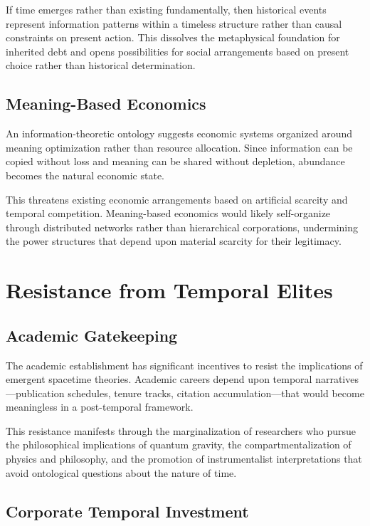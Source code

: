 \documentclass[12pt]{article}
\begin{document}
If time emerges rather than existing fundamentally, then historical events represent information patterns within a timeless structure rather than causal constraints on present action. This dissolves the metaphysical foundation for inherited debt and opens possibilities for social arrangements based on present choice rather than historical determination.

\subsection{Meaning-Based Economics}

An information-theoretic ontology suggests economic systems organized around meaning optimization rather than resource allocation. Since information can be copied without loss and meaning can be shared without depletion, abundance becomes the natural economic state.

This threatens existing economic arrangements based on artificial scarcity and temporal competition. Meaning-based economics would likely self-organize through distributed networks rather than hierarchical corporations, undermining the power structures that depend upon material scarcity for their legitimacy.

\section{Resistance from Temporal Elites}

\subsection{Academic Gatekeeping}

The academic establishment has significant incentives to resist the implications of emergent spacetime theories. Academic careers depend upon temporal narratives—publication schedules, tenure tracks, citation accumulation—that would become meaningless in a post-temporal framework.

This resistance manifests through the marginalization of researchers who pursue the philosophical implications of quantum gravity, the compartmentalization of physics and philosophy, and the promotion of instrumentalist interpretations that avoid ontological questions about the nature of time.

\subsection{Corporate Temporal Investment}
\end{document}
